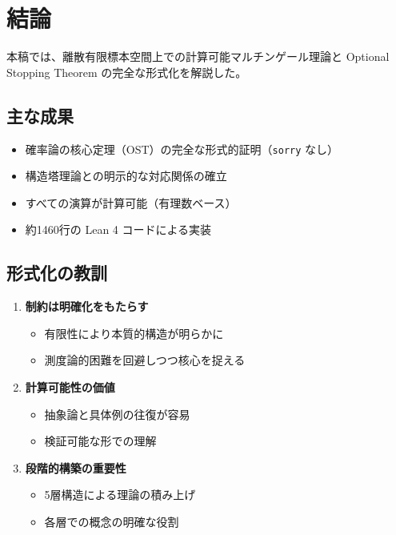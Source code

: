 \documentclass[a4paper,12pt]{ltjsarticle}
\theoremstyle{definition}
\begin{document}
\section{結論}

本稿では、離散有限標本空間上での計算可能マルチンゲール理論と
Optional Stopping Theorem の完全な形式化を解説した。

\subsection{主な成果}

\begin{itemize}
\item 確率論の核心定理（OST）の完全な形式的証明（\texttt{sorry} なし）
\item 構造塔理論との明示的な対応関係の確立
\item すべての演算が計算可能（有理数ベース）
\item 約1460行の Lean 4 コードによる実装
\end{itemize}

\subsection{形式化の教訓}

\begin{enumerate}
\item \textbf{制約は明確化をもたらす}
  \begin{itemize}
    \item 有限性により本質的構造が明らかに
    \item 測度論的困難を回避しつつ核心を捉える
  \end{itemize}

\item \textbf{計算可能性の価値}
  \begin{itemize}
    \item 抽象論と具体例の往復が容易
    \item 検証可能な形での理解
  \end{itemize}

\item \textbf{段階的構築の重要性}
  \begin{itemize}
    \item 5層構造による理論の積み上げ
    \item 各層での概念の明確な役割
  \end{itemize}
\end{enumerate}
\end{document}
